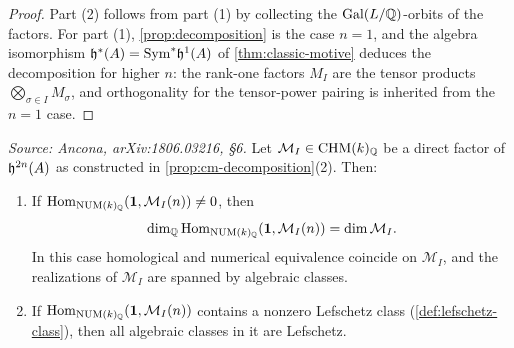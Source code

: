 \begin{proof}
  Part (2) follows from part (1) by collecting the \(\mathrm{Gal}(L/\mathbb{Q})\)-orbits of the
  factors. For part (1), \cref{prop:decomposition} is the case \(n = 1\), and the
  algebra isomorphism \(\mathfrak{h}^*(A) = \mathrm{Sym}^* \mathfrak{h}^1(A)\) of \cref{thm:classic-motive}
  deduces the decomposition for higher \(n\): the rank-one factors \(M_I\) are
  the tensor products \(\bigotimes_{\sigma \in I} M_\sigma\), and orthogonality
  for the tensor-power pairing is inherited from the \(n = 1\) case.
\end{proof}

\begin{proposition}
  \label{prop:factor-algebraic}
  \textit{Source: Ancona, arXiv:1806.03216, §6.}
  Let \(\mathcal{M}_I \in \mathrm{CHM}(k)_{\mathbb{Q}}\) be a direct factor of \(\mathfrak{h}^{2n}(A)\) as
  constructed in \cref{prop:cm-decomposition}(2). Then:
  \begin{enumerate}
    \item If \(\mathrm{Hom}_{\mathrm{NUM}(k)_{\mathbb{Q}}}(\mathbf{1}, \mathcal{M}_I(n)) \neq 0\), then
      \[\dim_{\mathbb{Q}} \mathrm{Hom}_{\mathrm{NUM}(k)_{\mathbb{Q}}}(\mathbf{1}, \mathcal{M}_I(n)) = \dim \mathcal{M}_I.\]
      In this case homological and numerical equivalence coincide on
      \(\mathcal{M}_I\), and the realizations of \(\mathcal{M}_I\) are spanned by
      algebraic classes.
    \item If \(\mathrm{Hom}_{\mathrm{NUM}(k)_{\mathbb{Q}}}(\mathbf{1}, \mathcal{M}_I(n))\) contains a nonzero
      Lefschetz class (\cref{def:lefschetz-class}), then all algebraic classes in
      it are Lefschetz.
  \end{enumerate}
\end{proposition}

